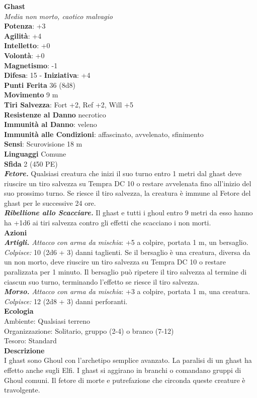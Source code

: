 \begin{multicols}{2}
\medskip\textbf{Ghast}\\
\emph{Media non morto, caotico malvagio}\\
\textbf{Potenza}: +3\\
\textbf{Agilità}: +4\\
\textbf{Intelletto}: +0\\
\textbf{Volontà}: +0\\
\textbf{Magnetismo}: -1\\
\textbf{Difesa}: 15 - \textbf{Iniziativa}: +4\\
\textbf{Punti Ferita} 36 (8d8)\\
\textbf{Movimento} 9 m\\
\textbf{Tiri Salvezza}: Fort +2, Ref +2, Will +5\\
\textbf{Resistenze al Danno} necrotico\\
\textbf{Immunità al Danno}: veleno\\
\textbf{Immunità alle Condizioni}: affascinato, avvelenato, sfinimento\\
\textbf{Sensi}: Scurovisione 18 m \\
\textbf{Linguaggi} Comune\\
\textbf{Sfida} 2 (450 PE)\smallskip\\
\emph{\textbf{Fetore.}} Qualsiasi creatura che inizi il suo turno entro 1 metri dal ghast deve riuscire un tiro salvezza su Tempra DC 10 o restare avvelenata fino all'inizio del suo prossimo turno. Se riesce il tiro  salvezza, la creatura è immune al Fetore del ghast per le successive 24 ore.\\
\emph{\textbf{Ribellione allo Scacciare.}} Il ghast e tutti i ghoul entro 9 metri da esso hanno ha +1d6 ai tiri salvezza contro gli effetti che scacciano i non morti. \\
\smallskip\textbf{Azioni}\\
\emph{\textbf{Artigli.} Attacco con arma da mischia}: +5 a colpire, portata 1 m, un bersaglio.\\
\emph{Colpisce:} 10 (2d6 + 3) danni taglienti. Se il bersaglio è una creatura, diversa da un non morto, deve riuscire un tiro salvezza su Tempra DC 10 o restare paralizzata per 1 minuto. Il bersaglio può ripetere il tiro salvezza al termine di ciascun suo turno, terminando l'effetto se riesce il tiro salvezza.\\
\emph{\textbf{Morso.} Attacco con arma da mischia}: +3 a colpire, portata 1 m, una creatura.\\
\emph{Colpisce:} 12 (2d8 + 3) danni perforanti.\\
\textbf{Ecologia}\\
Ambiente: Qualsiasi terreno\\
Organizzazione: Solitario, gruppo (2-4) o branco (7-12)\\
Tesoro: Standard\\
\textbf{Descrizione}\\
I ghast sono Ghoul con l’archetipo semplice avanzato. La paralisi di un ghast ha effetto anche sugli Elfi. I ghast si aggirano in branchi o comandano gruppi di Ghoul comuni. Il fetore di morte e putrefazione che circonda queste creature è travolgente.\\



\end{multicols}
